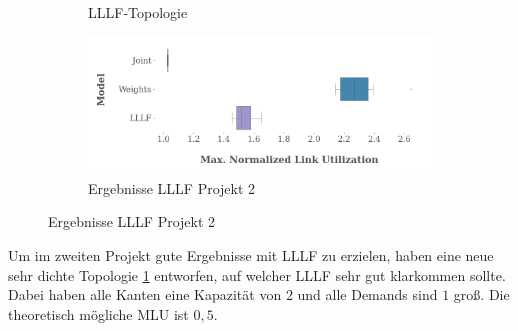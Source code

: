 \documentclass[sigconf,nonacm,review,language=english,language=german]{acmart}
\begin{document}
\begin{figure}[h]
\begin{subfigure}[c]{0.34\textwidth}
{
                    }
                    \caption{LLLF-Topologie}
                    \label{fig:ergebnisse_projekt_2_lllf_topologie} 
                \end{subfigure}
                \begin{subfigure}[c]{0.64\textwidth}
                    \centering
                    \includegraphics[width=\textwidth]{Grafiken/projekt2/result_lllf.png}
                    \caption{Ergebnisse LLLF Projekt 2}
                    \label{fig:ergebnisse_projekt_2_lllf_ergebnisse}
                \end{subfigure}
                \caption{Ergebnisse LLLF Projekt 2}
                \label{fig:ergebnisse_projekt_2_lllf}
            \end{figure}
            Um im zweiten Projekt gute Ergebnisse mit LLLF zu erzielen, haben eine neue sehr dichte Topologie \ref{fig:ergebnisse_projekt_2_lllf_topologie} entworfen, auf welcher LLLF sehr gut klarkommen sollte. Dabei haben alle Kanten eine Kapazität von $2$ und alle Demands sind $1$ groß. Die theoretisch mögliche MLU ist $0,5$.
        
\end{document}
